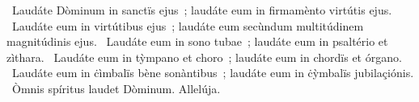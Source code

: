 \psalmChapterWithInscription{}
{ }
{%
~Laudáte Dòminum in sanctïs ejus~; laudáte eum in firmamènto virtútis ejus. 
~Laudáte eum in virtútibus ejus~; laudáte eum secùndum multitúdinem magnitúdinis ejus. 
~Laudáte eum in sono tubae~; laudáte eum in psaltério et zìthara. 
~Laudáte eum in tỳmpano et choro~; laudáte eum in chordïs et órgano. 
~Laudáte eum in ċìmbalïs bène sonàntibus~; laudáte eum in ċỳmbalïs jubilaçiónis. 
~Òmnis spíritus laudet Dòminum. Allelúja. 
}
